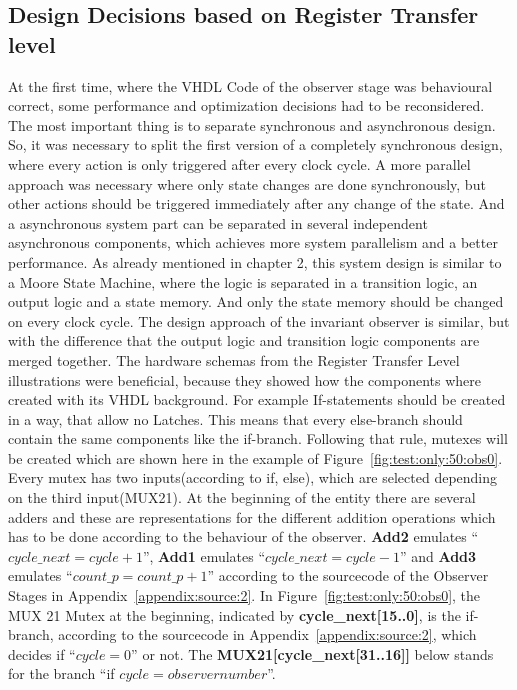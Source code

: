 \subsection{Design Decisions based on Register Transfer level}
\label{chapter:3:section:2:sub:3}
At the first time, where the VHDL Code of the observer stage was behavioural correct, some performance and optimization decisions had to be reconsidered. 
The most important thing is to separate synchronous and asynchronous design. So, it was necessary to split the first version of a completely synchronous design, where
every action is only triggered after every clock cycle. A more parallel approach was necessary where only state changes are done synchronously, but other actions should
be triggered immediately after any change of the state. And a asynchronous system part can be separated in several independent asynchronous components, which achieves more 
system parallelism and a better performance. As already mentioned in  chapter 2, this system design is similar to a Moore State Machine, where the logic 
is separated in a transition logic, an output logic and a state memory. And only the state memory should be changed on every clock cycle.
The design approach of the invariant observer is similar, but with the difference that the output logic and transition logic components are merged together. 
The hardware schemas from the Register Transfer Level illustrations were beneficial, because they showed how the components where created with its VHDL background. 
For example If-statements should be created in a way, that allow no Latches. This means that every else-branch should contain the same components like the if-branch. 
Following that rule, mutexes will be created which are shown here in the example of Figure~\ref{fig:test:only:50:obs0}. Every mutex has two inputs(according to if, else), which are
selected depending on the third input(MUX21).
At the beginning of the entity there are several adders and these are representations for the different addition operations
which has to be done according to the behaviour of the observer. \textbf{Add2} emulates ``$cycle\_next=cycle+1$'', \textbf{Add1} emulates ``$cycle\_next=cycle-1$'' and \textbf{Add3}
emulates ``$count\_p=count\_p+1$'' according to the sourcecode of the Observer Stages in Appendix~\ref{appendix:source:2}. 
In Figure~\ref{fig:test:only:50:obs0}, the MUX 21 Mutex at the beginning, indicated by \textbf{cycle\_next[15..0]}, is the if-branch, according to the sourcecode in Appendix~\ref{appendix:source:2}, 
which decides if ``$cycle=0$'' or not.
The \textbf{MUX21[cycle\_next[31..16]]} below stands for the branch ``if $cycle=observernumber$''. 
